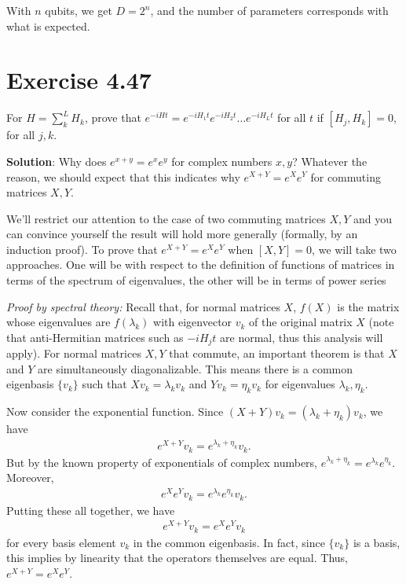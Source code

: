 \documentclass{book}
\begin{document}
    With $n$ qubits, we get $D = 2^n$, and the number of parameters corresponds with what is expected.

\section*{Exercise 4.47}
    For $H = \sum_k^L H_k$, prove that $e^{-iHt} = e^{-iH_1 t}e^{-iH_2 t}\dots e^{-iH_L t}$ for all $t$ if $[H_j, H_k] = 0$, for all $j, k$.

    \textbf{Solution}: Why does $e^{x+y} = e^x e^y$ for complex numbers $x, y$? Whatever the reason, we should expect that this indicates why $e^{X + Y} = e^X e^Y$ for commuting matrices $X, Y$.

    We'll restrict our attention to the case of two commuting matrices $X, Y$ and you can convince yourself the result will hold more generally (formally, by an induction proof). To prove that $e^{X+Y} = e^X e^Y$ when $[X,Y] = 0$, we will take two approaches. One will be with respect to the definition of functions of matrices in terms of the spectrum of eigenvalues, the other will be in terms of power series

    \emph{Proof by spectral theory:} Recall that, for normal matrices $X$, $f(X)$ is the matrix whose eigenvalues are $f(\lambda_k)$ with eigenvector $v_k$ of the original matrix $X$ (note that anti-Hermitian matrices such as $-i H_j t$ are normal, thus this analysis will apply). For normal matrices $X, Y$ that commute, an important theorem is that $X$ and $Y$ are simultaneously diagonalizable. This means there is a common eigenbasis  $\{v_k\}$ such that $X v_k = \lambda_k v_k$ and $Y v_k = \eta_k v_k$ for eigenvalues $\lambda_k, \eta_k$.

    Now consider the exponential function. Since $(X+Y)v_k = (\lambda_k + \eta_k) v_k$, we have
    \begin{align}
        e^{X+Y} v_k = e^{\lambda_k +\eta_k} v_k.
    \end{align}
    But by the known property of exponentials of complex numbers, $e^{\lambda_k +\eta_k} = e^{\lambda_k}e^{\eta_k}$. Moreover,
    \begin{align}
        e^X e^Y v_k = e^{\lambda_k}e^{\eta_k} v_k.
    \end{align}
    Putting these all together, we have
    \begin{align}
        e^{X+Y} v_k = e^{X}e^{Y} v_k
    \end{align}
    for every basis element $v_k$ in the common eigenbasis. In fact, since $\{v_k\}$ is a basis, this implies by linearity that the operators themselves are equal. Thus, $e^{X+Y} = e^X e^Y$.
\end{document}

